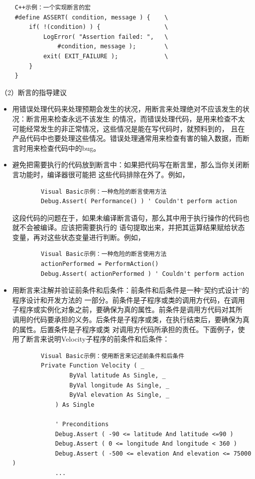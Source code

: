 \documentclass{article}
\begin{document}
\begin{lstlisting}
    C++示例：一个实现断言的宏
    #define ASSERT( condition, message ) {    \
        if( !(condition) ) {                  \
            LogError( "Assertion failed: ",   \
                #condition, message );        \
            exit( EXIT_FAILURE );             \
        }
    }
\end{lstlisting}
\par
（2）断言的指导建议
\par
\begin{itemize}
    \item 用错误处理代码来处理预期会发生的状况，用断言来处理绝对不应该发生的状况：断言用来检查永远不该发生
    的情况，而错误处理代码，是用来检查不太可能经常发生的非正常情况，这些情况是能在写代码时，就预料到的，
    且在产品代码中也要处理这些情况。错误处理通常用来检查有害的输入数据，而断言时用来检查代码中的bug。
    \item 避免把需要执行的代码放到断言中：如果把代码写在断言里，那么当你关闭断言功能时，编译器很可能把
    这些代码排除在外了。例如，
    \begin{lstlisting}
        Visual Basic示例：一种危险的断言使用方法
        Debug.Assert( Performance() ) ' Couldn't perform action
    \end{lstlisting}
    这段代码的问题在于，如果未编译断言语句，那么其中用于执行操作的代码也就不会被编译。应该把需要执行的
    语句提取出来，并把其运算结果赋给状态变量，再对这些状态变量进行判断。例如，
    \begin{lstlisting}
        Visual Basic示例：一种危险的断言使用方法
        actionPerformed = PerformAction()
        Debug.Assert( actionPerformed ) ' Couldn't perform action
    \end{lstlisting}
    \item 用断言来注解并验证前条件和后条件：前条件和后条件是一种“契约式设计”的程序设计和开发方法的
    一部分。前条件是子程序或类的调用方代码，在调用子程序或实例化对象之前，要确保为真的属性。前条件是调用方代码对其所
    调用的代码要承担的义务。后条件是子程序或类，在执行结束后，要确保为真的属性。后置条件是子程序或类
    对调用方代码所承担的责任。下面例子，使用了断言来说明Velocity子程序的前条件和后条件：
    \begin{lstlisting}
        Visual Basic示例：使用断言来记述前条件和后条件
        Private Function Velocity ( _
                ByVal latitude As Single, _
                ByVal longitude As Single, _
                ByVal elevation As Single, _
            ) As Single

            ' Preconditions
            Debug.Assert ( -90 <= latitude And latitude <=90 )
            Debug.Assert ( 0 <= longitude And longitude < 360 )
            Debug.Assert ( -500 <= elevation And elevation <= 75000 )
            ...


\end{lstlisting}
\end{itemize}
\end{document}
